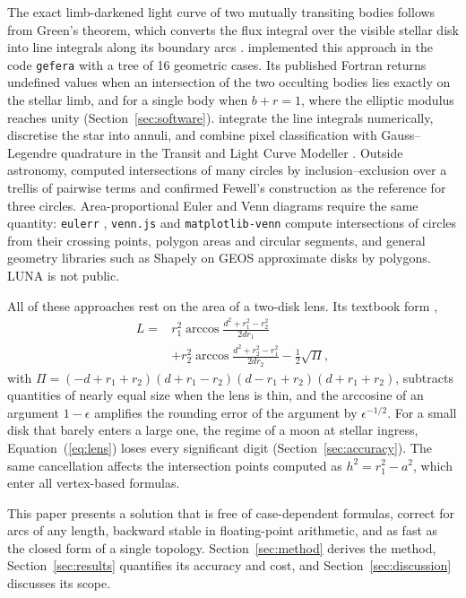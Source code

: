 \documentclass[twocolumn]{aastex701}
\begin{document}
The exact limb-darkened light curve of two mutually transiting bodies
follows from Green's theorem, which converts the flux integral over the
visible stellar disk into line integrals along its boundary arcs
\citep{Pal2012}. \citet{GordonAgol2022} implemented this approach in the
code \texttt{gefera} with a tree of 16 geometric cases. Its published
Fortran returns undefined values when an intersection of the two
occulting bodies lies exactly on the stellar limb, and for a single body
when $b+r=1$, where the elliptic modulus reaches unity
(Section~\ref{sec:software}). \citet{Short2018} integrate the line integrals
numerically, \citet{Luger2017} discretise the star into annuli, and
\citet{Kalman2023} combine pixel classification with Gauss--Legendre
quadrature in the Transit and Light Curve Modeller \citep{Csizmadia2020}.
Outside astronomy, \citet{Librino2014} computed intersections of many
circles by inclusion--exclusion over a trellis of pairwise terms and
confirmed Fewell's construction as the reference for three circles.
Area-proportional Euler and Venn diagrams require the same quantity:
\texttt{eulerr} \citep{eulerr}, \texttt{venn.js} \citep{vennjs} and
\texttt{matplotlib-venn} \citep{mplvenn} compute intersections of circles
from their crossing points, polygon areas and circular segments, and
general geometry libraries such as Shapely \citep{shapely} on GEOS
\citep{geos} approximate disks by polygons. LUNA is not public.

All of these approaches rest on the area of a two-disk lens. Its textbook
form \citep{Weisstein},
\begin{equation}
\begin{split}
L ={}& r_1^2\arccos\frac{d^2+r_1^2-r_2^2}{2dr_1}\\
&+ r_2^2\arccos\frac{d^2+r_2^2-r_1^2}{2dr_2} - \tfrac12\sqrt{\Pi},
\end{split}
\label{eq:lens}
\end{equation}
with $\Pi=(-d+r_1+r_2)(d+r_1-r_2)(d-r_1+r_2)(d+r_1+r_2)$, subtracts
quantities of nearly equal size when the lens is thin, and the arccosine of
an argument $1-\epsilon$ amplifies the rounding error of the argument by
$\epsilon^{-1/2}$. For a small disk that barely enters a large one, the
regime of a moon at stellar ingress, Equation~(\ref{eq:lens}) loses every
significant digit (Section~\ref{sec:accuracy}). The same cancellation
affects the intersection points computed as $h^2=r_1^2-a^2$, which enter
all vertex-based formulas.

This paper presents a solution that is free of case-dependent formulas,
correct for arcs of any length, backward stable in floating-point
arithmetic, and as fast as the closed form of a single topology.
Section~\ref{sec:method} derives the method,
Section~\ref{sec:results} quantifies its accuracy and cost, and
Section~\ref{sec:discussion} discusses its scope.
\end{document}
